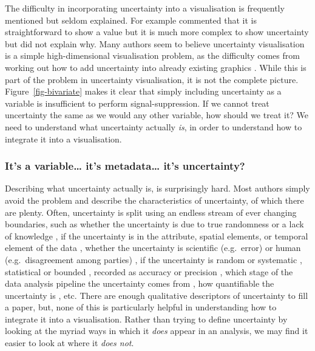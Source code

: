 \documentclass[
  12pt]{article}
\begin{document}
The difficulty in incorporating uncertainty into a visualisation is
frequently mentioned but seldom explained. For example
\citet{Hullman2016} commented that it is straightforward to show a value
but it is much more complex to show uncertainty but did not explain why.
Many authors seem to believe uncertainty visualisation is a simple
high-dimensional visualisation problem, as the difficulty comes from
working out how to add uncertainty into already existing graphics
\citep{Griethe2006}. While this is part of the problem in uncertainty
visualisation, it is not the complete picture.
Figure~\ref{fig-bivariate} makes it clear that simply including
uncertainty as a variable is insufficient to perform signal-suppression.
If we cannot treat uncertainty the same as we would any other variable,
how should we treat it? We need to understand what uncertainty actually
\emph{is}, in order to understand how to integrate it into a
visualisation.

\subsubsection{It's a variable\ldots{} it's metadata\ldots{} it's
uncertainty?}\label{its-a-variable-its-metadata-its-uncertainty}

Describing what uncertainty actually is, is surprisingly hard. Most
authors simply avoid the problem and describe the characteristics of
uncertainty, of which there are plenty. Often, uncertainty is split
using an endless stream of ever changing boundaries, such as whether the
uncertainty is due to true randomness or a lack of knowledge
\citep{Spiegelhalter2017, Hullman2016, utypo}, if the uncertainty is in
the attribute, spatial elements, or temporal element of the data
\citep{Kinkeldey2014}, whether the uncertainty is scientific
(e.g.~error) or human (e.g.~disagreement among parties)
\citep{Benjamin2018}, if the uncertainty is random or systematic
\citep{Sanyal2009}, statistical or bounded
\citep{Gschwandtnei2016, Olston2002}, recorded as accuracy or precision
\citep{Griethe2006, Benjamin2018}, which stage of the data analysis
pipeline the uncertainty comes from \citep{utypo}, how quantifiable the
uncertainty is \citep{Spiegelhalter2017, utypo}, etc. There are enough
qualitative descriptors of uncertainty to fill a paper, but, none of
this is particularly helpful in understanding how to integrate it into a
visualisation. Rather than trying to define uncertainty by looking at
the myriad ways in which it \emph{does} appear in an analysis, we may
find it easier to look at where it \emph{does not}.
\end{document}
